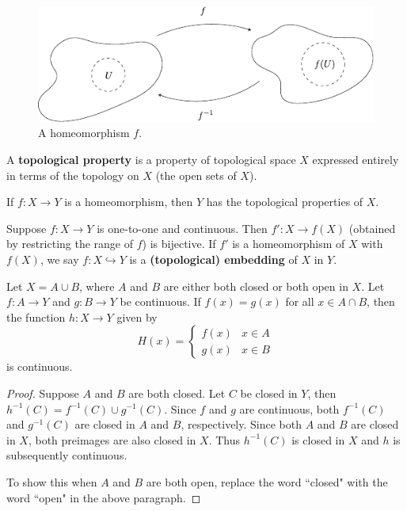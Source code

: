 \documentclass[10pt]{report}
\begin{document}
\begin{figure}[H]
	\centering
	\includegraphics[scale=1.3]{fig/homeomorphism.pdf}
	\caption{A homeomorphism $f$.}
\end{figure}

\begin{defn}
	A \textbf{topological property} is a property of topological space $X$ expressed entirely in terms of the topology on $X$ (the open sets of $X$).
\end{defn}

If $f:X \to Y$ is a homeomorphism, then $Y$ has the topological properties of $X$.

\begin{defn}
	Suppose $f: X \to  Y$ is one-to-one and continuous. Then $f':X \to  f(X)$ (obtained by restricting the range of $f$) is bijective. If $f'$ is a homeomorphism of $X$ with $f(X)$, we say $f: X \hookrightarrow  Y$ is a \textbf{(topological) embedding} of $X$ in $Y$.
\end{defn}

\begin{thrm}
	Let $X = A \cup B$, where $A$ and $B$ are either both closed or both open in $X$. Let $f:A \to Y$ and $g:B\to Y$ be continuous. If $f(x)=g(x)$ for all $x \in A \cap B$, then the function $h : X \to Y$ given by
	\[
		H(x)=
		\begin{cases}
			f(x) & x \in A \\
			g(x) & x\in B
		\end{cases}
	\] is continuous.
\end{thrm}
\begin{proof}
	Suppose $A$ and $B$ are both closed. Let $C$ be closed in $Y$, then $h^{-1}(C) = f^{-1}(C) \cup g^{-1}(C)$. Since $f$ and $g$ are continuous, both $f^{-1}(C)$ and $g^{-1}(C)$ are closed in $A$ and $B$, respectively. Since both $A$ and $B$ are closed in $X$, both preimages are also closed in $X$. Thus $h^{-1}(C)$ is closed in $X$ and $h$ is subsequently continuous.

	To show this when $A$ and $B$ are both open, replace the word ``closed" with the word ``open" in the above paragraph.
\end{proof}
\end{document}
